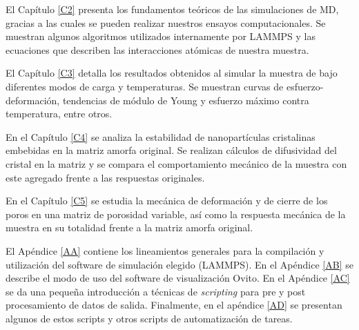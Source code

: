 El Capítulo \ref{C2} presenta los fundamentos teóricos de las simulaciones de MD, gracias a las cuales se pueden realizar nuestros ensayos computacionales. Se muestran algunos algoritmos utilizados internamente por LAMMPS y las ecuaciones que describen las interacciones atómicas de nuestra muestra.

El Capítulo \ref{C3} detalla los resultados obtenidos al simular la muestra de \CuZr bajo diferentes modos de carga y temperaturas. Se muestran curvas de esfuerzo-deformación, tendencias de módulo de Young y esfuerzo máximo contra temperatura, entre otros.

En el Capítulo \ref{C4} se analiza la estabilidad de nanopartículas cristalinas embebidas en la matriz amorfa original. Se realizan cálculos de difusividad del cristal en la matriz y se compara el comportamiento mecánico de la muestra con este agregado frente a las respuestas originales.

En el Capítulo \ref{C5} se estudia la mecánica de deformación y de cierre de los poros en una matriz de porosidad variable, así como la respuesta mecánica de la muestra en su totalidad frente a la matriz amorfa original. 

El Apéndice \ref{AA} contiene los lineamientos generales para la compilación y utilización del software de simulación elegido (LAMMPS). En el Apéndice \ref{AB} se describe el modo de uso del software de visualización Ovito. En el Apéndice \ref{AC} se da una pequeña introducción a técnicas de \textit{scripting} para pre y post procesamiento de datos de salida. Finalmente, en el apéndice \ref{AD} se presentan algunos de estos scripts y otros scripts de automatización de tareas.